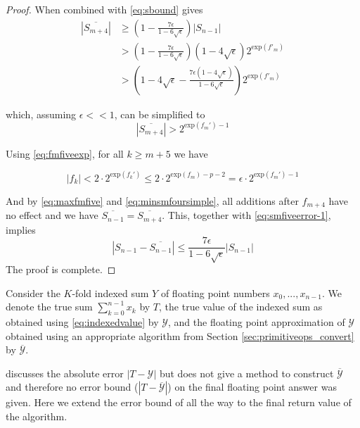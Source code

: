 \documentclass[12pt]{article}
\providecommand{\exp}{\ensuremath{\text{exp}}}
\theoremstyle{definition}
\numberwithin{equation}{section}
\numberwithin{figure}{section}
\begin{document}
\begin{proof}
      When combined with \eqref{eq:sbound} gives
      \begin{align*}
        \left|\overline{S_{m+4}}\right|
        & \geq \left(1-\frac{7 \epsilon}{1-6\sqrt{\epsilon}}\right) |S_{n-1}| \\
        & > \left(1-\frac{7 \epsilon}{1-6\sqrt{\epsilon}}\right) \left(1-4\sqrt{\epsilon}\right) 2^{\exp(f'_m)} \\
        & > \left(1-4\sqrt{\epsilon} - \frac{7 \epsilon \left(1-4\sqrt{\epsilon}\right)}{1-6\sqrt{\epsilon}}\right) 2^{\exp(f'_m)}
      \end{align*}

      which, assuming $\epsilon << 1$, can be simplified to
      \begin{equation}
        \left|\overline{S_{m + 4}}\right| > 2^{\exp(f_m') - 1}
        \label{eq:minsmfoursimple}
      \end{equation}

      Using  \eqref{eq:fmfiveexp}, for all $k \geq m + 5$ we have

      \begin{equation}
        |f_k| < 2 \cdot 2^{\exp(f_k')} \leq 2 \cdot 2^{\exp(f_m) - p - 2} = \epsilon \cdot 2^{\exp(f_m') - 1}
        \label{eq:maxfmfive}
      \end{equation}

      And by \eqref{eq:maxfmfive} and \eqref{eq:minsmfoursimple}, all additions after $f_{m + 4}$ have no effect and we have $\overline{S_{n-1}} = \overline{S_{m+4}}$.
      This, together with \eqref{eq:smfiveerror-1}, implies
      \begin{equation*}
        \left|S_{n-1} - \overline{S_{n-1}}\right| \leq \frac{7\epsilon}{1-6\sqrt{\epsilon}} |S_{n-1}|
      \end{equation*}
      The proof is complete.
    \end{proof}

    Consider the $K$-fold indexed sum $Y$ of floating point numbers $x_0, ..., x_{n - 1}$. We denote the true sum $\sum \limits_{k = 0}^{n - 1} x_k$ by $T$, the true value of the indexed sum as obtained using  \eqref{eq:indexedvalue} by $\mathcal{Y}$, and the floating point approximation of $\mathcal{Y}$ obtained using an appropriate algorithm from Section \ref{sec:primitiveops_convert} by $\overline{\mathcal{Y}}$.

    \cite{repsum} discusses the absolute error $|T - \mathcal{Y}|$ but does not give a method to construct $\overline{\mathcal{Y}}$ and therefore no error bound ($|T - \overline{\mathcal{Y}}|$) on the final floating point answer was given. Here we extend the error bound of \cite{repsum} all the way to the final return value of the algorithm.
\end{document}
